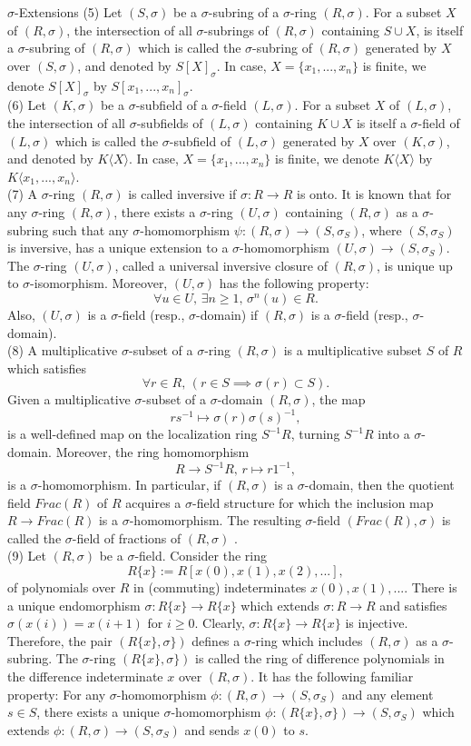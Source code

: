\documentclass[11pt,a4paper]{article}
\theoremstyle{theorem}
\numberwithin{equation}{section}
\newcommand{\s}{\sigma}
\begin{document}
\begin{section}{$\s$-Extensions}
	(5) Let $(S,\s)$ be a $\s$-subring of a $\s$-ring $(R,\s)$. For a subset $X$ of  $(R,\s)$, the intersection of all $\s$-subrings of $(R,\s)$ containing $S\cup X$, is itself a $\s$-subring of $(R,\s)$ which is called the $\s$-subring of $(R,\s)$ generated by $X$ over $(S,\s)$, and denoted by $S[X]_{\s}$. In case, $X=\{x_1,...,x_n\}$ is finite, we denote  $S[X]_{\s}$ by $S[x_1,...,x_n]_\s$. \\
	(6) Let $(K,\s)$ be a $\s$-subfield of a $\s$-field $(L,\s)$. For a subset $X$ of  $(L,\s)$, the intersection of all $\s$-subfields of $(L,\s)$ containing $K\cup X$ is itself a $\s$-field of $(L,\s)$ which is called the $\s$-subfield of $(L,\s)$ generated by $X$ over $(K,\s)$, and denoted by $K\langle X \rangle$. In case, $X=\{x_1,...,x_n\}$ is finite, we denote  $K\langle X \rangle$ by $K\langle x_1,...,x_n \rangle$. \\
	(7) A $\s$-ring $(R,\s)$ is called inversive if $\s:R\to R$ is onto. It is known that for any $\s$-ring $(R,\s)$, there exists a $\s$-ring $(U,\s)$ containing $(R,\s)$ as a $\s$-subring such that any $\s$-homomorphism $\psi:(R,\s)\to (S,\s_S)$, where $(S,\s_S)$ is inversive, has a unique extension to a $\s$-homomorphism $(U,\s)\to (S,\s_S)$. The $\s$-ring $(U,\s)$, called a universal inversive closure of $(R,\s)$, is unique up to $\s$-isomorphism.  Moreover, $(U,\s)$ has the following property:
	$$\forall u\in U,\, \exists n\geq 1, \, \s^n(u)\in R.$$
	Also, $(U,\s)$ is a $\s$-field (resp., $\s$-domain) if $(R,\s)$ is  a $\s$-field (resp., $\s$-domain). \\
	(8) A multiplicative $\s$-subset of a $\s$-ring $(R,\s)$ is a multiplicative subset $S$ of $R$ which satisfies  
	$$\forall r\in R,\, \left( r\in S \implies \s(r)\subset S\right) .$$
	Given a multiplicative   $\s$-subset of a $\s$-domain $(R,\s)$, the map $$rs^{-1}\mapsto \s(r)\s(s)^{-1},$$ is a well-defined map on the localization ring $S^{-1}R$, turning $S^{-1}R$ into a $\s$-domain. Moreover, the ring homomorphism  
	$$R\to S^{-1}R,\, r\mapsto r1^{-1},$$
	is a $\s$-homomorphism. In particular, if $(R,\s)$ is a $\s$-domain, then  the quotient field $Frac(R)$ of $R$ acquires a $\s$-field structure for which the inclusion map $R\to Frac(R)$ is a $\s$-homomorphism. The resulting $\s$-field $(Frac(R),\s)$ is called the $\s$-field of fractions of $(R,\s)$ . \\
	(9) Let $(R,\s)$ be a $\s$-field. Consider the ring 
	$$R\{x\}:=R[x(0),x(1),x(2),...],$$ 
	of polynomials over $R$ in (commuting) indeterminates $x(0),x(1),...$. There is a unique endomorphism 
	$\s:R\{x\}\to R\{x\}$ which extends $\s:R\to R$ and satisfies $\s(x(i))=x(i+1)$ for $i\geq 0$. Clearly, $\s:R\{x\}\to R\{x\}$  is injective. Therefore, the pair $(R\{x\},\s\})$ defines a $\s$-ring which includes $(R,\s)$ as a $\s$-subring. The $\s$-ring  $(R\{x\},\s\})$ is called  
	the ring of difference polynomials  in the difference indeterminate $x$ over $(R,\s)$. It has the following familiar property: For any $\s$-homomorphism $\phi:(R,\s)\to (S,\s_S)$ and any element $s\in S$, there exists a unique $\s$-homomorphism $\phi:(R\{x\},\s\})\to (S,\s_S)$ which extends $\phi:(R,\s)\to (S,\s_S)$  and sends $x(0)$ to $s$.  


\end{section}
\end{document}
